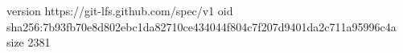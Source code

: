 version https://git-lfs.github.com/spec/v1
oid sha256:7b93fb70e8d802ebc1da82710ce434044f804c7f207d9401da2c711a95996c4a
size 2381
